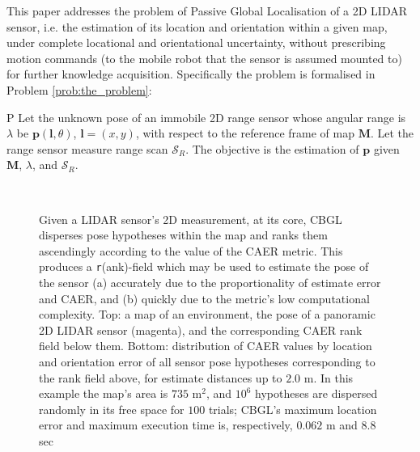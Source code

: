 This paper addresses the problem of Passive Global Localisation of a 2D LIDAR
sensor, i.e. the estimation of its location and orientation within a given map,
under complete locational and orientational uncertainty, without prescribing
motion commands (to the mobile robot that the sensor is assumed mounted to) for
further knowledge acquisition. Specifically the problem is formalised in
Problem \ref{prob:the_problem}:

\begin{customprb}{P}
  \label{prob:the_problem}
  Let the unknown pose of an immobile 2D range sensor whose angular range is
  $\lambda$ be $\bm{p}(\bm{l},\theta)$, $\bm{l} = (x,y)$, with respect to the
  reference frame of map $\bm{M}$. Let the range sensor measure range scan
  $\mathcal{S}_R$. The objective is the estimation of $\bm{p}$ given $\bm{M}$,
  $\lambda$, and $\mathcal{S}_R$.
\end{customprb}

\begin{figure}\vspace{0.4em}
  \subfloat{    \label{fig:a}} \vspace{-1.7cm}\\
  \subfloat{\hspace{-0.3cm} \label{fig:b}}
  \caption{\small
           Given a LIDAR sensor's 2D measurement, at its core, CBGL disperses
           pose hypotheses within the map and ranks them ascendingly according
           to the value of the CAER metric. This produces a
           \texttt{r}(ank)-field which may be used to estimate the pose of the
           sensor (a) accurately due to the proportionality of estimate error
           and CAER, and (b) quickly due to the metric's low computational
           complexity.  Top: a map of an environment, the pose of a panoramic
           2D LIDAR sensor (magenta), and the corresponding CAER rank field
           below them.  Bottom: distribution of CAER values by location and
           orientation error of all sensor pose hypotheses corresponding to the
           rank field above, for estimate distances up to $2.0$ m.  In this
           example the map's area is $735$ m$^2$, and $10^6$ hypotheses are
           dispersed randomly in its free space for $100$ trials; CBGL's
           maximum location error and maximum execution time is,
           respectively, $0.062$ m and $8.8$ sec
           }
  \vspace{-0.75cm}
  \label{fig:face}
\end{figure}
